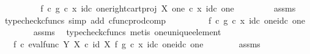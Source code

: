 \begin{isabellebody}
\ \ \ \ \isamarkupfalse%
\ \isamarkupfalse%
\ {\isachardoublequoteopen}{\isachardot}{\kern0pt}{\isachardot}{\kern0pt}{\isachardot}{\kern0pt}\ {\isacharequal}{\kern0pt}\ f\isactrlsup {\isasymflat}\ {\isasymcirc}\isactrlsub c\ {\isasymlangle}g\isactrlsup {\isasymflat}\ {\isasymcirc}\isactrlsub c\ {\isasymlangle}x{\isacharcomma}{\kern0pt}\ id\isactrlsub c\ one{\isasymrangle}{\isacharcomma}{\kern0pt}right{\isacharunderscore}{\kern0pt}cart{\isacharunderscore}{\kern0pt}proj\ X\ one\ {\isasymcirc}\isactrlsub c\ {\isasymlangle}x{\isacharcomma}{\kern0pt}\ id\isactrlsub c\ one{\isasymrangle}\ {\isasymrangle}{\isachardoublequoteclose}\isanewline
\ \ \ \ \ \ \isamarkupfalse%
\ assms\ \isamarkupfalse%
\ {\isacharparenleft}{\kern0pt}typecheck{\isacharunderscore}{\kern0pt}cfuncs{\isacharcomma}{\kern0pt}\ simp\ add{\isacharcolon}{\kern0pt}\ cfunc{\isacharunderscore}{\kern0pt}prod{\isacharunderscore}{\kern0pt}comp{\isacharparenright}{\kern0pt}\isanewline
\ \ \ \ \isamarkupfalse%
\ \isamarkupfalse%
\ {\isachardoublequoteopen}{\isachardot}{\kern0pt}{\isachardot}{\kern0pt}{\isachardot}{\kern0pt}\ {\isacharequal}{\kern0pt}\ f\isactrlsup {\isasymflat}\ {\isasymcirc}\isactrlsub c\ {\isasymlangle}g\isactrlsup {\isasymflat}\ {\isasymcirc}\isactrlsub c\ {\isasymlangle}x{\isacharcomma}{\kern0pt}\ id\isactrlsub c\ one{\isasymrangle}{\isacharcomma}{\kern0pt}id\isactrlsub c\ one{\isasymrangle}{\isachardoublequoteclose}\isanewline
\ \ \ \ \ \ \isamarkupfalse%
\ assms\ \isamarkupfalse%
\ {\isacharparenleft}{\kern0pt}typecheck{\isacharunderscore}{\kern0pt}cfuncs{\isacharcomma}{\kern0pt}\ metis\ one{\isacharunderscore}{\kern0pt}unique{\isacharunderscore}{\kern0pt}element{\isacharparenright}{\kern0pt}\isanewline
\ \ \ \ \isamarkupfalse%
\ \isamarkupfalse%
\ {\isachardoublequoteopen}{\isachardot}{\kern0pt}{\isachardot}{\kern0pt}{\isachardot}{\kern0pt}\ {\isacharequal}{\kern0pt}\ f\isactrlsup {\isasymflat}\ {\isasymcirc}\isactrlsub c\ {\isasymlangle}{\isacharparenleft}{\kern0pt}eval{\isacharunderscore}{\kern0pt}func\ Y\ X{\isacharparenright}{\kern0pt}\ {\isasymcirc}\isactrlsub c\ {\isacharparenleft}{\kern0pt}id\ X\ {\isasymtimes}\isactrlsub f\ g{\isacharparenright}{\kern0pt}\ {\isasymcirc}\isactrlsub c\ {\isasymlangle}x{\isacharcomma}{\kern0pt}\ id\isactrlsub c\ one{\isasymrangle}{\isacharcomma}{\kern0pt}id\isactrlsub c\ one{\isasymrangle}{\isachardoublequoteclose}\isanewline
\ \ \ \ \ \ \isamarkupfalse%
\ assms\ \isamarkupfalse%

\end{isabellebody}
